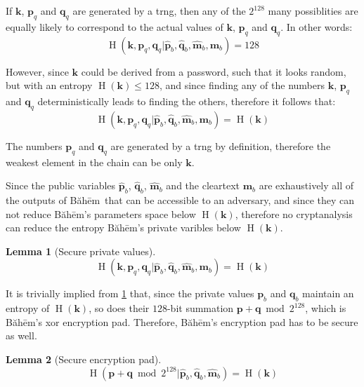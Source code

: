 \documentclass[twocolumn,hidelinks]{article}
\newcommand{\baheem}{Băhēm}
\DeclareMathOperator{\entropy}{H}
\newtheorem{lemma}{Lemma}
\begin{document}
If $\mathbf{k}$, $\mathbf{p}_q$ and $\mathbf{q}_q$ are generated by a
\gls{trng}, then any of the $2^{128}$ many possiblities are equally likely
to correspond to the actual values of $\mathbf{k}$, $\mathbf{p}_q$ and
$\mathbf{q}_q$.  In other words:
\[
    \entropy(\mathbf{k},\mathbf{p}_q,\mathbf{q}_q
        | \mathbf{\hat p}_b,
          \mathbf{\hat q}_b,
          \mathbf{\hat m}_b,
          \mathbf{m}_b
    )
    = 128
\]

However, since $\mathbf{k}$ could be derived from a password, such that it
looks random, but with an entropy $\entropy(\mathbf{k}) \le 128$, and since
finding any of the numbers $\mathbf{k}$, $\mathbf{p}_q$ and $\mathbf{q}_q$
deterministically leads to finding the others, therefore it follows that:
\[
    \entropy(\mathbf{k},\mathbf{p}_q,\mathbf{q}_q
        | \mathbf{\hat p}_b,
          \mathbf{\hat q}_b,
          \mathbf{\hat m}_b,
          \mathbf{m}_b
    )
    = \entropy(\mathbf{k})
\]

The numbers $\mathbf{p}_q$ and $\mathbf{q}_q$ are generated by a \gls{trng}
by definition, therefore the weakest element in the chain can be only
$\mathbf{k}$.

Since the public variables $\mathbf{\hat p}_b$, $\mathbf{\hat q}_b$,
$\mathbf{\hat m}_b$ and the cleartext $\mathbf{m}_b$ are exhaustively all
of the outputs of \baheem\ that can be accessible to an adversary, and
since they can not reduce \baheem's parameters space below
$\entropy(\mathbf{k})$, therefore no cryptanalysis can reduce the entropy
\baheem's private varibles below $\entropy(\mathbf{k})$.

\begin{lemma}[Secure private values]
    \[
        \entropy(\mathbf{k},\mathbf{p}_q,\mathbf{q}_q
            | \mathbf{\hat p}_b,
              \mathbf{\hat q}_b,
              \mathbf{\hat m}_b,
              \mathbf{m}_b
        )
        = \entropy(\mathbf{k})
    \]
    \label{thrm_baheem_secure_private_values}
\end{lemma}

It is trivially implied from \cref{thrm_baheem_secure_private_values} that,
since the private values $\mathbf{p}_b$ and $\mathbf{q}_b$ maintain an
entropy of $\entropy(\mathbf{k})$, so does their $128$-bit summation
$\mathbf{p} + \mathbf{q} \bmod{2^{128}}$, which is \baheem's \gls{xor}
encryption pad.  Therefore, \baheem's encryption pad has to be secure as
well.

\begin{lemma}[Secure encryption pad]
    \[
        \entropy(
            \mathbf{p} + \mathbf{q} \bmod{2^{128}}
            | \mathbf{\hat p}_b,
              \mathbf{\hat q}_b,
              \mathbf{\hat m}_b
        )
        = \entropy(\mathbf{k})
    \]
    \label{thrm_baheem_secure_encryption_pad}
\end{lemma}
\end{document}
